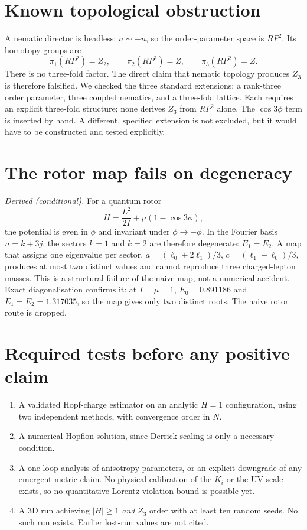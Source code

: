 \documentclass[11pt]{article}
\begin{document}
\section{Known topological obstruction}
\label{sec:topology}

A nematic director is headless: $n\sim-n$, so the order-parameter space is
$RP^2$. Its homotopy groups are
\begin{equation}
\pi_1(RP^2)=Z_2,\qquad \pi_2(RP^2)=Z,\qquad \pi_3(RP^2)=Z.
\label{eq:pi}
\end{equation}
There is no three-fold factor. The direct claim that nematic topology
produces $Z_3$ is therefore falsified. We checked the three standard
extensions: a rank-three order parameter, three coupled nematics, and a
three-fold lattice. Each requires an explicit three-fold structure; none
derives $Z_3$ from $RP^2$ alone. The $\cos3\phi$ term is inserted by hand.
A different, specified extension is not excluded, but it would have to be
constructed and tested explicitly.

\section{The rotor map fails on degeneracy}
\label{sec:rotor}

\emph{Derived (conditional).} For a quantum rotor
\begin{equation}
H=\frac{L^2}{2I}+\mu\left(1-\cos3\phi\right),
\label{eq:rotor}
\end{equation}
the potential is even in $\phi$ and invariant under $\phi\to-\phi$. In the
Fourier basis $n=k+3j$, the sectors $k=1$ and $k=2$ are therefore degenerate:
$E_1=E_2$. A map that assigns one eigenvalue per sector,
$a=(\ell_0+2\ell_1)/3$, $c=(\ell_1-\ell_0)/3$, produces at most two distinct
values and cannot reproduce three charged-lepton masses. This is a structural
failure of the naive map, not a numerical accident. Exact diagonalisation
confirms it: at $I=\mu=1$, $E_0=0.891186$ and $E_1=E_2=1.317035$, so the map
gives only two distinct roots. The naive rotor route is dropped.

\section{Required tests before any positive claim}
\label{sec:tests}

\begin{enumerate}
\item A validated Hopf-charge estimator on an analytic $H=1$ configuration,
using two independent methods, with convergence order in $N$.
\item A numerical Hopfion solution, since Derrick scaling is only a necessary
condition.
\item A one-loop analysis of anisotropy parameters, or an explicit downgrade of
any emergent-metric claim. No physical calibration of the $K_i$ or the UV
scale exists, so no quantitative Lorentz-violation bound is possible yet.
\item A 3D run achieving $|H|\ge1$ \emph{and} $Z_3$ order with at least ten
random seeds. No such run exists. Earlier lost-run values are not cited.
\end{enumerate}
\end{document}
